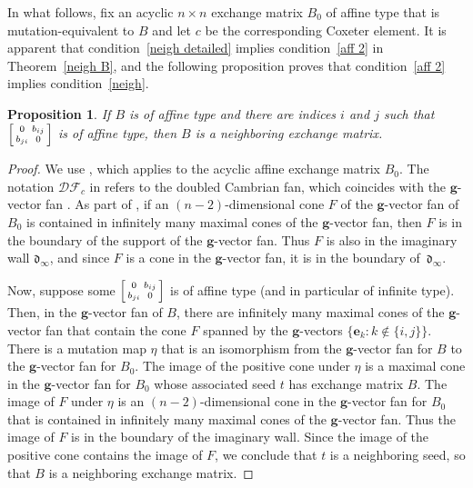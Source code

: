 \documentclass[10pt]{article}
\newtheorem{proposition}{Proposition}[section]
\theoremstyle{definition}
\theoremstyle{remark}
\numberwithin{equation}{section}
\newcommand{\set}[1]{{\lbrace #1 \rbrace}}
\newcommand{\0}{{\mathbf{0}}}
\newcommand{\g}{\mathbf{g}}
\renewcommand{\b}{\mathbf{b}}
\newcommand{\e}{\mathbf{e}}
\renewcommand{\d}{{\mathfrak d}}
\newcommand{\DF}{{\mathcal {DF}}}
\begin{document}
In what follows, fix an acyclic $n\times n$ exchange matrix $B_0$ of affine type that is mutation-equivalent to $B$ and let $c$ be the corresponding Coxeter element.
It is apparent that condition~\ref{neigh detailed} implies condition~\ref{aff 2} in Theorem~\ref{neigh B}, and the following proposition proves that condition~\ref{aff 2} implies condition~\ref{neigh}.
\begin{proposition}\label{aff 2 block}
If $B$ is of affine type and there are indices $i$ and $j$ such that $\begin{bsmallmatrix}0&b_{ij}\\b_{ji}&0\end{bsmallmatrix}$ is of affine type, then $B$ is a neighboring exchange matrix.
\end{proposition}

\begin{proof}
We use \cite[Corollary~4.18]{afframe}, which applies to the acyclic affine exchange matrix $B_0$.
The notation $\DF_c$ in \cite{afframe} refers to the doubled Cambrian fan, which coincides with the $\g$-vector fan \cite[Corollary~1.3]{afframe}.
As part of \cite[Corollary~4.18]{afframe}, if an $(n-2)$-dimensional cone $F$ of the $\g$-vector fan of $B_0$ is contained in infinitely many maximal cones of the $\g$-vector fan, then $F$ is in the boundary of the support of the $\g$-vector fan.
Thus $F$ is also in the imaginary wall $\d_\infty$, and since $F$ is a cone in the $\g$-vector fan, it is in the boundary of~$\d_\infty$.

Now, suppose some $\begin{bsmallmatrix}0&b_{ij}\\b_{ji}&0\end{bsmallmatrix}$ is of affine type (and in particular of infinite type).
Then, in the $\g$-vector fan of $B$, there are infinitely many maximal cones of the $\g$-vector fan that contain the cone $F$ spanned by the $\g$-vectors $\set{\e_k:k\not\in\set{i,j}}$.
There is a mutation map $\eta$ that is an isomorphism from the $\g$-vector fan for $B$ to the $\g$-vector fan for $B_0$.
The image of the positive cone under $\eta$ is a maximal cone in the $\g$-vector fan for $B_0$ whose associated seed $t$ has exchange matrix $B$.
The image of $F$ under $\eta$ is an $(n-2)$-dimensional cone in the $\g$-vector fan for $B_0$ that is contained in infinitely many maximal cones of the $\g$-vector fan.
Thus the image of $F$ is in the boundary of the imaginary wall.
Since the image of the positive cone contains the image of $F$, we conclude that $t$ is a neighboring seed, so that $B$ is a neighboring exchange matrix.
\end{proof}
\end{document}
